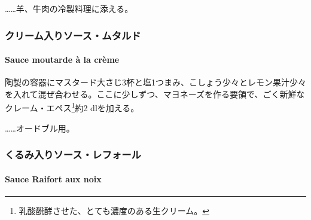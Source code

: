 \begin{recette}
\ldots{}\ldots{}羊、牛肉の冷製料理に添える。

\maeaki

\hypertarget{ux30afux30eaux30fcux30e0ux5165ux308aux30bdux30fcux30b9ux30e0ux30bfux30ebux30c9}{%
\subsubsection{クリーム入りソース・ムタルド}\label{ux30afux30eaux30fcux30e0ux5165ux308aux30bdux30fcux30b9ux30e0ux30bfux30ebux30c9}}

\hypertarget{sauce-moutarde-a-la-creme}{%
\paragraph{Sauce moutarde à la crème}\label{sauce-moutarde-a-la-creme}}


陶製の容器にマスタード大さじ3杯と塩1つまみ、こしょう少々とレモン果汁少々を入れて混ぜ合わせる。ここに少しずつ、マヨネーズを作る要領で、ごく新鮮なクレーム・エペス\footnote{乳酸醗酵させた、とても濃度のある生クリーム。}約2
dlを加える。

\ldots{}\ldots{}オードブル用。

\maeaki

\hypertarget{ux304fux308bux307fux5165ux308aux30bdux30fcux30b9ux30ecux30d5ux30a9ux30fcux30eb}{%
\subsubsection{くるみ入りソース・レフォール}\label{ux304fux308bux307fux5165ux308aux30bdux30fcux30b9ux30ecux30d5ux30a9ux30fcux30eb}}

\hypertarget{sauce-raifort-aux-noix}{%
\paragraph{Sauce Raifort aux noix}\label{sauce-raifort-aux-noix}}


\end{recette}

